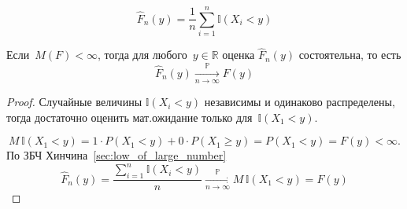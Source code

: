 \documentclass[../handbook.tex]{subfiles}
\begin{document}
\begin{equation}
    \label{eq:emirical_cdf}
    \hat F_n(y) = \frac1n \sum_{i=1}^n \mathbb{I}(X_i < y)
\end{equation}

\begin{theorem}
    Если~$M(F) < \infty$, тогда для любого~$y\in\mathbb{R}$ оценка $\hat F_n(y)$ состоятельна, то есть
    \begin{equation}
        \label{eq:emp_cdf_theorem}
        \hat F_n(y) \xrightarrow[n \to \infty]{\mathbb{P}} F(y)%
    \end{equation}
\end{theorem}
\begin{proof}
    Случайные величины $\mathbb I(X_i < y)$ независимы и одинаково распределены, тогда достаточно оценить мат.ожидание только для~$\mathbb I(X_1 < y)$.

    \[
        M\,\mathbb I(X_1 < y) = 1 \cdot P(X_1 < y) + 0 \cdot P(X_1 \geq y) = P(X_1 < y) = F(y) < \infty.
    \]
По ЗБЧ Хинчина~\ref{sec:low_of_large_number}
\[
    \hat F_n(y) =
        \frac{\sum_{i=1}^n \mathbb{I}(X_i < y)}{n} 
        \xrightarrow[n \to \infty]{\mathbb{P}}
    M\,\mathbb I(X_1 < y)
    = F(y)
\]
\end{proof}
\end{document}
